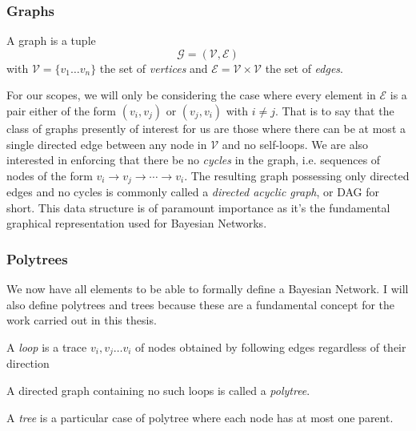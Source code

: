 \subsubsection{Graphs} 
\begin{definition}
	A graph is a tuple 
	\begin{equation}
	\mathcal{G} = (\mathcal{V}, \mathcal{E})
\end{equation}
with $\mathcal{V} = \{ v_1 \ldots v_n \}$ the set of \textit{vertices} and $\mathcal{E} = \mathcal{V} \times \mathcal{V}$ the set of \textit{edges}.
\end{definition}

For our scopes, we will only be considering the case where every element in $\mathcal{E}$ is a pair either of the form $(v_i, v_j)$ or $(v_j, v_i)$ with $i \neq j$.  
That is to say that the class of graphs presently of interest for us are those where there can be at most a single directed edge between any node in $\mathcal{V}$ and no self-loops.
We are also interested in enforcing that there be no \textit{cycles} in the graph, i.e. sequences of nodes of the form $v_i \rightarrow v_j \rightarrow \cdots \rightarrow v_i$.
The resulting graph possessing only directed edges and no cycles is commonly called a \textit{directed acyclic graph}, or DAG for short.  
This data structure is of paramount importance as it's the fundamental graphical representation used for Bayesian Networks.

\subsubsection{Polytrees}
We now have all elements to be able to formally define a Bayesian Network.
I will also define polytrees and trees because these are a fundamental concept for the work carried out in this thesis.
\begin{definition}
	A \textit{loop} is a trace $v_i, v_j \ldots v_i$ of nodes obtained by following edges regardless of their direction
\end{definition}
\begin{definition}
	A directed graph containing no such loops is called a \textit{polytree}. 
\end{definition}
\begin{definition}
	A \textit{tree} is a particular case of polytree where each node has at most one parent.	
\end{definition}

